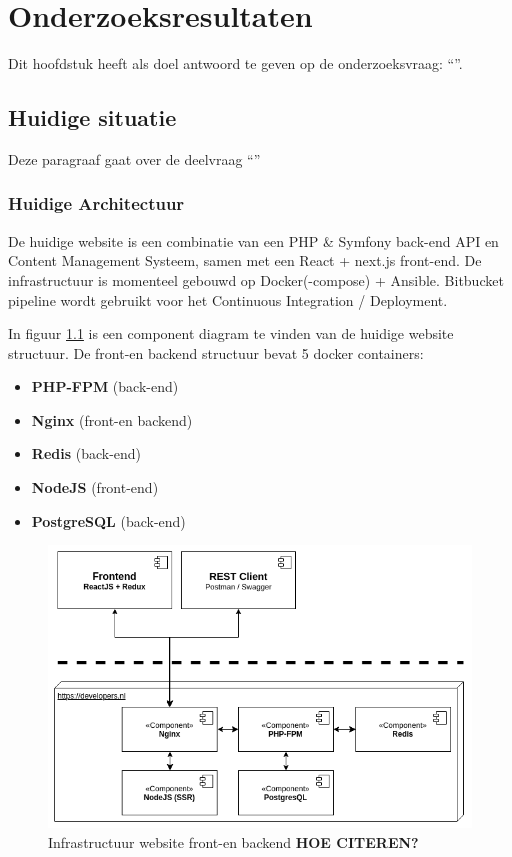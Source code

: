 \chapter{Onderzoeksresultaten}

\label{Chapter3}

Dit hoofdstuk heeft als doel antwoord te geven op de onderzoeksvraag: \enquote{\hoofdvraagname}.

\section{Huidige situatie}
Deze paragraaf gaat over de deelvraag \enquote{\deelhuidig}

\subsection{Huidige Architectuur}
De huidige website is een combinatie van een PHP \& Symfony back-end API en Content Management Systeem, samen met een React + next.js front-end. De infrastructuur is momenteel gebouwd op Docker(-compose) + Ansible. Bitbucket pipeline wordt gebruikt voor het Continuous Integration / Deployment. 

In figuur \ref{fig:infra} is een component diagram te vinden van de huidige website structuur. De front-en backend structuur bevat 5 docker containers:
\begin{itemize}
	\item \textbf{PHP-FPM} (back-end)
	\item \textbf{Nginx} (front-en backend)
	\item \textbf{Redis} (back-end)
	\item \textbf{NodeJS} (front-end)
	\item \textbf{PostgreSQL} (back-end)
\end{itemize}

\begin{figure}
	\centering
	\includegraphics[width=13cm]{Figures/Infrastructure}
	\decoRule
	\caption[Infrastructuur]{Infrastructuur website front-en backend \textbf{HOE CITEREN?}}
	\label{fig:infra}
\end{figure}

